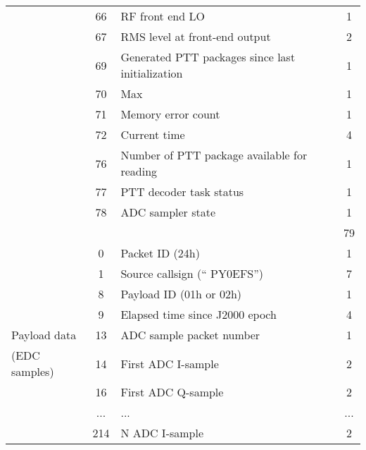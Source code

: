\begin{longtable}[c]{lcL{0.4\textwidth}c}
                                            & 66 & RF front end LO                      & 1 \\
                                            & 67 & RMS level at front-end output        & 2 \\
                                            & 69 & Generated PTT packages since last initialization & 1 \\
                                            & 70 & Max                                  & 1 \\
                                            & 71 & Memory error count                   & 1 \\
                                            & 72 & Current time                         & 4 \\
                                            & 76 & Number of PTT package available for reading & 1 \\
                                            & 77 & PTT decoder task status              & 1 \\
                                            & 78 & ADC sampler state                    & 1 \\
                                            &    &                                      & 79 \\
                                            & 0  & Packet ID (24h)                      & 1 \\
                                            & 1  & Source callsign (`` PY0EFS'')        & 7 \\
                                            & 8  & Payload ID (01h or 02h)              & 1 \\
                                            & 9  & Elapsed time since J2000 epoch       & 4 \\
    Payload data                            & 13 & ADC sample packet number             & 1 \\
    (EDC samples)                           & 14 & First ADC I-sample                   & 2 \\
                                            & 16 & First ADC Q-sample                   & 2 \\
                                            & ... & ...                                 & ... \\
                                            & 214 & N ADC I-sample                      & 2 \\

\end{longtable}
